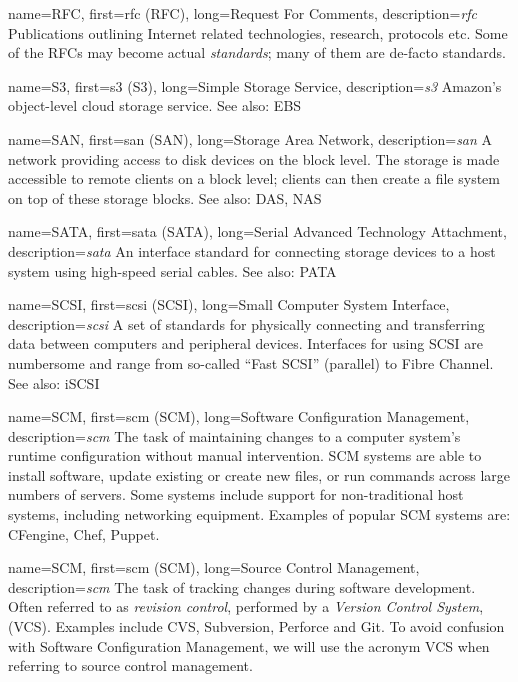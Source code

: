 {
	name={RFC},
	first={\acrlong{rfc} (RFC)},
	long={Request For Comments},
	description={{\em \acrlong{rfc}} Publications outlining Internet
related technologies, research, protocols etc.  Some of the RFCs may
become actual {\em standards}; many of them are de-facto standards.}
}

{
	name={S3},
	first={\acrlong{s3} (S3)},
	long={Simple Storage Service},
	description={{\em \acrlong{s3}} Amazon's object-level cloud storage
service.  See also: EBS}
}

{
	name={SAN},
	first={\acrlong{san} (SAN)},
	long={Storage Area Network},
	description={{\em \acrlong{san}} A network providing access to disk
devices on the block level.  The storage is made accessible to remote
clients on a block level; clients can then create a file system on top of
these storage blocks.  See also: DAS, NAS}
}

{
	name={SATA},
	first={\acrlong{sata} (SATA)},
	long={Serial Advanced Technology Attachment},
	description={{\em \acrlong{sata}} An interface
standard for connecting storage devices to a host system using high-speed
serial cables.  See also: PATA}
}

{
	name={SCSI},
	first={\acrlong{scsi} (SCSI)},
	long={Small Computer System Interface},
	description={{\em \acrlong{scsi}} A set of standards for
physically connecting and transferring data between computers and
peripheral devices.  Interfaces for using SCSI are numbersome and range
from so-called ``Fast SCSI'' (parallel) to Fibre
Channel.  See also: iSCSI}
}

{
	name={SCM},
	first={\acrlong{scm} (SCM)},
	long={Software Configuration Management},
	description={{\em \acrlong{scm}} The task of maintaining
changes to a computer system's runtime configuration without manual
intervention.  SCM systems are able to install software, update existing
or create new files, or run commands across large numbers of servers.
Some systems include support for non-traditional host systems, including
networking equipment.  Examples of popular SCM systems are: CFengine,
Chef, Puppet.}
}

{
	name={SCM},
	first={\acrlong{scm} (SCM)},
	long={Source Control Management},
	description={{\em \acrlong{scm}} The task of tracking changes
during software development.  Often referred to as {\em revision control},
performed by a {\em Version Control System}, (VCS).  Examples include CVS,
Subversion, Perforce and Git. To avoid confusion with Software
Configuration Management, we will use the acronym VCS when referring to
source control management.}
}

